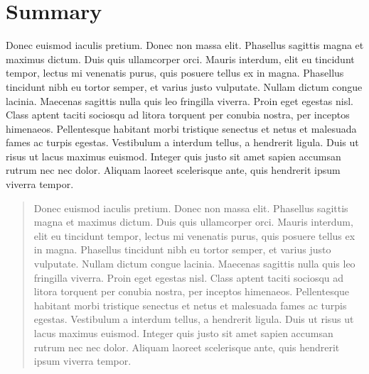 \documentclass[format=acmsmall, review=false, screen=true]{acmart}
\begin{document}
\section{Summary}

Donec euismod iaculis pretium. Donec non massa elit. Phasellus sagittis magna et maximus dictum. Duis quis ullamcorper orci. Mauris interdum, elit eu tincidunt tempor, lectus mi venenatis purus, quis posuere tellus ex in magna. Phasellus tincidunt nibh eu tortor semper, et varius justo vulputate. Nullam dictum congue lacinia. Maecenas sagittis nulla quis leo fringilla viverra. Proin eget egestas nisl. Class aptent taciti sociosqu ad litora torquent per conubia nostra, per inceptos himenaeos. Pellentesque habitant morbi tristique senectus et netus et malesuada fames ac turpis egestas. Vestibulum a interdum tellus, a hendrerit ligula. Duis ut risus ut lacus maximus euismod. Integer quis justo sit amet sapien accumsan rutrum nec nec dolor. Aliquam laoreet scelerisque ante, quis hendrerit ipsum viverra tempor.

\renewcommand{\abstractname}{Acknowledgements}
\begin{abstract}
Donec euismod iaculis pretium. Donec non massa elit. Phasellus sagittis magna et maximus dictum. Duis quis ullamcorper orci. Mauris interdum, elit eu tincidunt tempor, lectus mi venenatis purus, quis posuere tellus ex in magna. Phasellus tincidunt nibh eu tortor semper, et varius justo vulputate. Nullam dictum congue lacinia. Maecenas sagittis nulla quis leo fringilla viverra. Proin eget egestas nisl. Class aptent taciti sociosqu ad litora torquent per conubia nostra, per inceptos himenaeos. Pellentesque habitant morbi tristique senectus et netus et malesuada fames ac turpis egestas. Vestibulum a interdum tellus, a hendrerit ligula. Duis ut risus ut lacus maximus euismod. Integer quis justo sit amet sapien accumsan rutrum nec nec dolor. Aliquam laoreet scelerisque ante, quis hendrerit ipsum viverra tempor.
\end{abstract}
\end{document}
